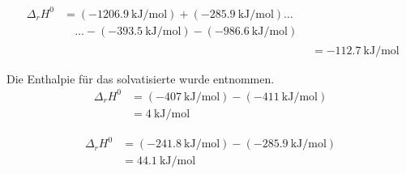 \documentclass[ahaeffekt]{exercise}
\begin{document}
{\begin{alphlist}
 \item {}
       \begin{align*}
        \begin{split}\Delta_rH^0 &= (\SI{-1206.9}{\kilo\joule\per\mole}) + (\SI{-285.9}{\kilo\joule\per\mole})\ldots\\
                                 &\quad\ldots - (\SI{-393.5}{\kilo\joule\per\mole}) - (\SI{-986.6}{\kilo\joule\per\mole})
        \end{split}\\
         &= \SI{-112.7}{\kilo\joule\per\mole}
       \end{align*}
 \item {}
       Die Enthalpie für das solvatisierte  wurde \citet{wikipedia} entnommen.
       \begin{align*}
        \Delta_rH^0 &= (\SI{-407}{\kilo\joule\per\mole}) - (\SI{-411}{\kilo\joule\per\mole})\\
         &= \SI{4}{\kilo\joule\per\mole}
       \end{align*}
 \item {}
       \begin{align*}
        \Delta_rH^0 &= (\SI{-241.8}{\kilo\joule\per\mole}) - (\SI{-285.9}{\kilo\joule\per\mole})\\
         &= \SI{44.1}{\kilo\joule\per\mole}
       \end{align*}
\end{alphlist}
}
\end{document}
